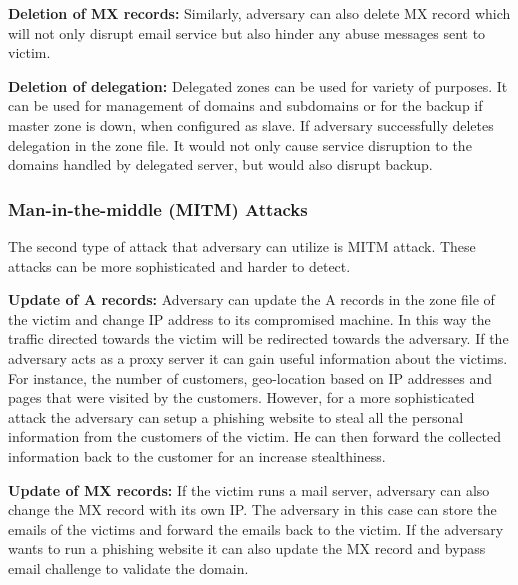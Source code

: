 \textbf{Deletion of MX records:} Similarly, adversary can also delete MX record which will not only disrupt email service but also hinder any abuse messages sent to victim.  



 \textbf{Deletion of delegation:} Delegated zones can be used for variety of purposes. It can be used for management of domains and subdomains or for the backup if master zone is down,  when configured as slave. If adversary successfully deletes delegation in the zone file. It would not only cause service disruption to the  domains handled by delegated server, but would also disrupt backup. 


\subsubsection{Man-in-the-middle (MITM) Attacks}
The second type of attack that adversary can utilize is MITM attack. These attacks can be more sophisticated and harder to detect. 

\textbf{Update of A records:}
Adversary can update the A records in the zone file of the victim and change IP address to its compromised machine. In this way the traffic directed towards the victim will be redirected towards the adversary. If the adversary acts as a proxy server it can gain useful information about the victims. For instance, the number of customers, geo-location based on IP addresses and pages that were visited by the customers. However, for a more sophisticated attack the adversary can setup a phishing website to steal all the personal information from the customers of the victim. He can then forward the collected information back to the customer for an increase stealthiness. 

\textbf{Update of MX records:} 
If the victim runs a mail server, adversary can also change the MX record with its own IP. The adversary in this case can store the emails of the victims and forward the emails back to the victim. If the adversary wants to run a phishing website it can also update the MX record and bypass email challenge to validate the domain. 





